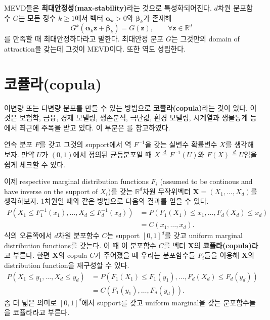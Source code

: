 \documentclass[b5paper,]{scrbook}
\theoremstyle{plain}
\theoremstyle{definition}
\numberwithin{equation}{section}
\begin{document}
MEVD들은 \textbf{최대안정성(max-stability)}라는 것으로 특성화되어진다. \(d\)차원 분포함수 \(G\)는 모든 정수 \(k\geq 1\)에서 벡터 \(\boldsymbol{\alpha}_{k}>0\)와 \(\boldsymbol{\beta}_{k}\)가 존재해
\begin{equation}
G^{k}(\boldsymbol{\alpha}_{k}\mathbf{z}+\boldsymbol{\beta}_{k}) = G(\mathbf{z}), \qquad{\forall \mathbf{z}\in\mathbb{R}^{d}}
\label{eq:MEVDmaxstable}
\end{equation}
를 만족할 때 최대안정하다라고 말한다. 최대안정 분포 \(G\)는 그것만의 domain of attraction을 갖는데 그것이 MEVD이다. 또한 역도 성립한다.

\hypertarget{copula}{%
\section{코퓰라(copula)}\label{copula}}

이변량 또는 다변량 분포를 만들 수 있는 방법으로 \textbf{코퓰라(copula)}라는 것이 있다. 이것은 보험학, 금융, 경제 모델링, 생존분석, 극단값, 환경 모델링, 시계열과 생물통계 등에서 최근에 주목을 받고 있다. 이 부분은 \citep{Mikosch2006}를 참고하였다.

연속 분포 \(F\)를 갖고 그것의 support에서 역 \(F^{-1}\)을 갖는 실변수 확률변수 \(X\)를 생각해보자. 만약 \(U\)가 \((0,1)\)에서 정의된 균등분포일 때 \(X\stackrel{d}{=}F^{-1}(U)\)와 \(F(X)\stackrel{d}{=}U\)임을 쉽게 체크할 수 있다.

이제 respective marginal distribution functions \(F_{i}\) (assumed to be continous and have inverse on the support of \(X_{i}\))를 갖는 \(\mathbb{R}^{d}\)차원 무작위벡터 \(\mathbf{X}=(X_{1},\ldots, X_{d})\)를 생각하보자. 1차원일 때와 같은 방법으로 다음의 결과를 얻을 수 있다.
\[
\begin{align*} 
P(X_{1}\leq F_{1}^{-1}(x_{1}),\ldots, X_{d}\leq F_{d}^{-1}(x_{d})) &=  P(F_{1}(X_{1})\leq x_{1}, \ldots, F_{d}(X_{d})\leq x_{d}) \\ 
 &= C(x_{1},\ldots, x_{d}).
\end{align*}
\]
식의 오른쪽에서 \(d\)차원 분포함수 \(C\)는 support \([0,1]^{d}\)를 갖고 uniform marginal distribution functions를 갖는다. 이 때 이 분포함수 \(C\)를 벡터 \(\mathbf{X}\)의 \textbf{코퓰라(copula)}라고 부른다. 한편 \(\mathbf{X}\)의 copula \(C\)가 주어졌을 때 우리는 분포함수들 \(F_{i}\)들을 이용해 \(\mathbf{X}\)의 distribution function을 재구성할 수 있다.
\[
\begin{align*} 
P(X_{1}\leq y_{1}, \ldots, X_{d}\leq y_{d}) &=  P(F_{1}(X_{1})\leq F_{1}(y_{1}), \ldots, F_{d}(X_{d})\leq F_{d}(y_{d})) \\ 
 &= C(F_{1}(y_{1}),\ldots,F_{d}(y_{d})).
\end{align*}
\]
좀 더 넓은 의미로 \([0,1]^{d}\)에서 support를 갖고 uniform marginal을 갖는 분포함수들을 코퓰라라고 부른다.
\end{document}
